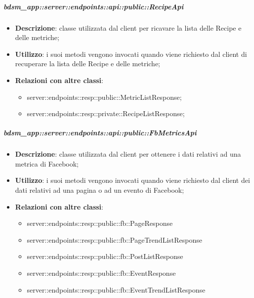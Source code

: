     \subparagraph{bdsm\_app::server::endpoints::api::public::RecipeApi} %
    \label{subp:bdsm_app_server_endpoints_api_public_recipeapi}
    \begin{itemize}
      \item \textbf{Descrizione}: classe utilizzata dal client per ricavare la lista delle Recipe e delle metriche;
      \item \textbf{Utilizzo}: i suoi metodi vengono invocati quando viene richiesto dal client di recuperare la lista delle Recipe e delle metriche;
      \item \textbf{Relazioni con altre classi}:
        \begin{itemize}
          \item server::endpoints::resp::public::MetricListResponse;
          \item server::endpoints::resp::private::RecipeListResponse;
        \end{itemize}
      \end{itemize}
    
    \subparagraph{bdsm\_app::server::endpoints::api::public::FbMetricsApi} %
    \label{subp:bdsm_app_server_endpoints_api_public_fbmetricsapi}
    \begin{itemize}
      \item \textbf{Descrizione}: classe utilizzata dal client per ottenere i dati relativi ad una metrica di Facebook;
      \item \textbf{Utilizzo}: i suoi metodi vengono invocati quando viene richiesto dal client dei dati relativi ad una pagina o ad un evento di Facebook;
      \item \textbf{Relazioni con altre classi}:
        \begin{itemize}
          \item server::endpoints::resp::public::fb::PageResponse
          \item server::endpoints::resp::public::fb::PageTrendListResponse
          \item server::endpoints::resp::public::fb::PostListResponse
          \item server::endpoints::resp::public::fb::EventResponse
          \item server::endpoints::resp::public::fb::EventTrendListResponse
        \end{itemize}
      \end{itemize}
    
